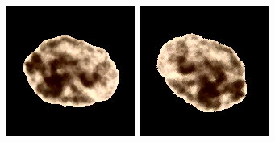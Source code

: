 \begin{figure}[t!]
	\centering
	\includegraphics[width=0.97\linewidth]{Figures/Chapter4/aug_0.png}	
	\endminipage\hfill
	\centering	
	\includegraphics[width=0.97\linewidth]{Figures/Chapter4/aug_1.png}

\end{figure}
